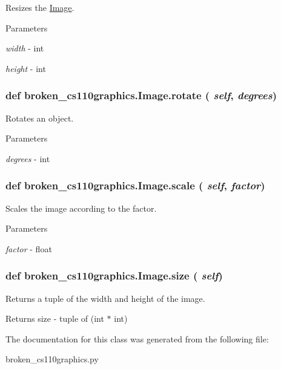 Resizes the \hyperlink{classbroken__cs110graphics_1_1Image}{Image}. 
\begin{DoxyParams}{Parameters}
\item[{\em width}]-\/ int \item[{\em height}]-\/ int \end{DoxyParams}
\hypertarget{classbroken__cs110graphics_1_1Image_a9b5140ffcf53916d30e69a91c1e891ed}{
\subsubsection[{rotate}]{\setlength{\rightskip}{0pt plus 5cm}def broken\_\-cs110graphics.Image.rotate ( {\em self}, \/   {\em degrees})}}
\label{classbroken__cs110graphics_1_1Image_a9b5140ffcf53916d30e69a91c1e891ed}


Rotates an object. 
\begin{DoxyParams}{Parameters}
\item[{\em degrees}]-\/ int \end{DoxyParams}
\hypertarget{classbroken__cs110graphics_1_1Image_a7c200c523a71bb307a215b3551ec1d0f}{
\subsubsection[{scale}]{\setlength{\rightskip}{0pt plus 5cm}def broken\_\-cs110graphics.Image.scale ( {\em self}, \/   {\em factor})}}
\label{classbroken__cs110graphics_1_1Image_a7c200c523a71bb307a215b3551ec1d0f}


Scales the image according to the factor. 
\begin{DoxyParams}{Parameters}
\item[{\em factor}]-\/ float \end{DoxyParams}
\hypertarget{classbroken__cs110graphics_1_1Image_a16199f1f2ff5405b71a1ec0246534bca}{
\subsubsection[{size}]{\setlength{\rightskip}{0pt plus 5cm}def broken\_\-cs110graphics.Image.size ( {\em self})}}
\label{classbroken__cs110graphics_1_1Image_a16199f1f2ff5405b71a1ec0246534bca}


Returns a tuple of the width and height of the image. \begin{DoxyReturn}{Returns}
size -\/ tuple of (int $\ast$ int) 
\end{DoxyReturn}


The documentation for this class was generated from the following file:\begin{DoxyCompactItemize}
\item 
broken\_\-cs110graphics.py\end{DoxyCompactItemize}
